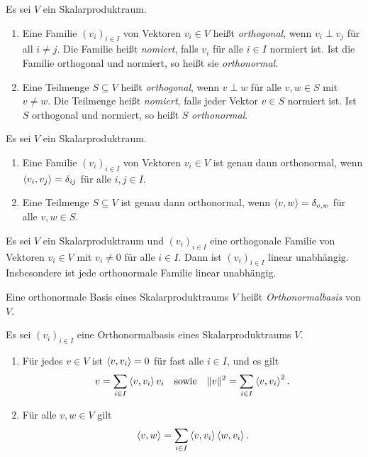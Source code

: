 \begin{definition}
  Es sei $V$ ein Skalarproduktraum.
  \begin{enumerate}[leftmargin=*, label=\roman*)]
    \item
      Eine Familie $(v_i)_{i \in I}$ von Vektoren $v_i \in V$ heißt \emph{orthogonal}, wenn $v_i \perp v_j$ für all $i \neq j$.
      Die Familie heißt \emph{nomiert}, falls $v_i$ für alle $i \in I$ normiert ist.
      Ist die Familie orthogonal und normiert, so heißt sie \emph{orthonormal}.
    \item
      Eine Teilmenge $S \subseteq V$ heißt \emph{orthogonal}, wenn $v \perp w$ für alle $v, w \in S$ mit $v \neq w$.
      Die Teilmenge heißt \emph{nomiert}, falls jeder Vektor $v \in S$ normiert ist.
      Ist $S$ orthogonal und normiert, so heißt $S$ \emph{orthonormal}.
  \end{enumerate}
\end{definition}



\begin{lemma}
  Es sei $V$ ein Skalarproduktraum.
  \begin{enumerate}[leftmargin=*]
    \item
      Eine Familie $(v_i)_{i \in I}$ von Vektoren $v_i \in V$ ist genau dann orthonormal, wenn $\left\langle v_i, v_j \right\rangle = \delta_{ij}$ für alle $i,j \in I$.
    \item
      Eine Teilmenge $S \subseteq V$ ist genau dann orthonormal, wenn $\left\langle v, w \right\rangle = \delta_{v,w}$ für alle $v, w \in S$.
  \end{enumerate}  
\end{lemma}


\begin{lemma}
  Es sei $V$ ein Skalarproduktraum und $(v_i)_{i \in I}$ eine orthogonale Familie von Vektoren $v_i \in V$ mit $v_i \neq 0$ für alle $i \in I$.
  Dann ist $(v_i)_{i \in I}$ linear unabhängig.
  Insbesondere ist jede orthonormale Familie linear unabhängig.
\end{lemma}


\begin{definition}
  Eine orthonormale Basis eines Skalarproduktraums $V$ heißt \emph{Orthonormalbasis} von $V$.
\end{definition}


\begin{proposition}
  Es sei $(v_i)_{i \in I}$ eine Orthonormalbasis eines Skalarproduktraums $V$.
  \begin{enumerate}
    \item
      Für jedes $v \in V$ ist $\left\langle v, v_i \right\rangle = 0$ für fast alle $i \in I$, und es gilt
      \begin{gather*}
        v = \sum_{i \in I} \left\langle v, v_i \right\rangle v_i
      \quad\text{sowie}\quad
        \|v\|^2 = \sum_{i \in I} \left\langle v, v_i \right\rangle^2.
      \end{gather*}
    \item
      Für alle $v, w \in V$ gilt
      \[
        \left\langle v, w \right\rangle
        = \sum_{i \in I} \left\langle v, v_i \right\rangle \left\langle w, v_i \right\rangle.
      \]
  \end{enumerate}
\end{proposition}


